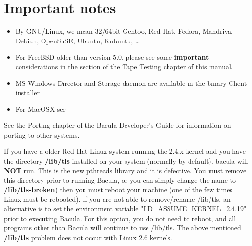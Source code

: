 \section*{Important notes}

\begin{itemize}
\item By GNU/Linux, we mean 32/64bit Gentoo, Red Hat, Fedora, Mandriva,
    Debian, OpenSuSE, Ubuntu, Kubuntu, \dots

\item For FreeBSD older than version 5.0,
  please see some {\bf important} considerations in the
    section of the
  Tape Testing chapter of this manual.

\item MS Windows Director and Storage daemon are available
      in the binary Client installer

\item For MacOSX see 
\end{itemize}

See the Porting chapter of the Bacula Developer's Guide for information on
porting to other systems.

If you have a older Red Hat Linux system running the 2.4.x kernel and you have
the directory {\bf /lib/tls} installed on your system (normally by default),
bacula will {\bf NOT} run. This is the new pthreads library and it is
defective. You must remove this directory prior to running Bacula, or you can
simply change the name to {\bf /lib/tls-broken}) then you must reboot your
machine (one of the few times Linux must be rebooted). If you are not able to
remove/rename /lib/tls, an alternative is to set the environment variable
"LD\_ASSUME\_KERNEL=2.4.19" prior to executing Bacula. For this option, you do
not need to reboot, and all programs other than Bacula will continue to use
/lib/tls.
The above mentioned {\bf /lib/tls} problem does not occur with Linux 2.6 kernels.
